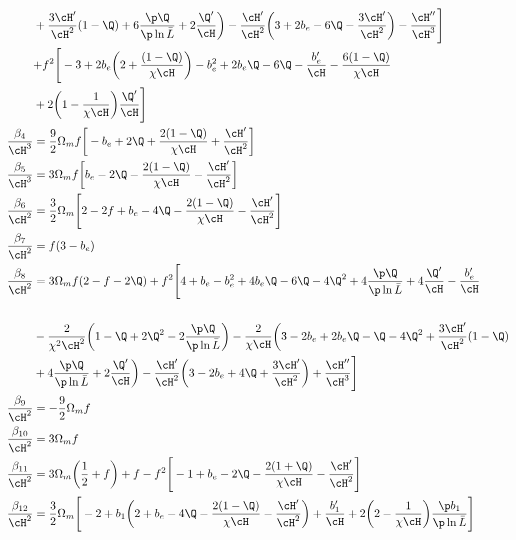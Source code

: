 \begin{align}
& +\frac{3\cH'}{\cH^{2}}(1-\Q) +6\frac{\p \Q}{\p \ln{\bar{L}}} + 2\frac{\Q'}{\cH}\bigg) -\frac{\cH'}{\cH^{2}}\bigg({3}+2b_{e}-6\Q-\frac{3\cH'}{\cH^{2}}\bigg) - \frac{\cH''}{\cH^{3}}\Bigg] \nonumber \\
&  {+} f^{2}\Bigg[-3+2b_{e}\bigg(2+\frac{(1-\Q)}{\chi\cH}\bigg)-b_{e}^{2}+2b_{e}\Q -6\Q-\frac{b_{e}'}{\cH}-\frac{6(1-\Q)}{\chi\cH}\nonumber \\
& +2\bigg(1-\frac{1}{\chi\cH}\bigg)\frac{\Q'}{\cH}\Bigg]  \\ 
\frac{\beta_{4}}{\cH^{3}} &= \frac{9}{2}\Omega_{m}f\bigg[-b_{e}+2\Q+\frac{2(1-\Q)}{\chi \cH}+\frac{\cH'}{\cH^{2}}\bigg]\\ 
{{\frac{\beta_5}{\cH^{3}}}} &= 3\Omega_{m}f\bigg[b_{e}-2\Q-\frac{2(1-\Q)}{\chi\cH}-\frac{\cH'}{\cH^{2}}\bigg] \\ 
\frac{\beta_6}{\cH^{2}} &= \frac{3}{2}\Omega_{m}\Bigg[2-2f+b_{e}-4\Q-\frac{2(1-\Q)}{\chi\cH}-\frac{\cH'}{\cH^{2}}\Bigg] \\
\frac{\beta_7}{\cH^{2}} &= f(3-b_{e}) \\ 
\frac{\beta_8}{\cH^{2}} &= {3\Omega_{m}f(2-f-2\Q)} + f^{2}\Bigg[4+b_{e}-b_{e}^{2}+4b_{e}\Q-{6}\Q-4\Q^{2}+4\frac{\p \Q}{\p \ln{\bar{L}}} + 4\frac{\Q'}{\cH} - \frac{b_{e}'}{\cH}  \nonumber \\\nonumber\\
& - \frac{2}{\chi^{2}\cH^{2}}\bigg(1-\Q+2\Q^{2}-2\frac{\p \Q}{\p \ln{\bar{L}}}\bigg) - \frac{2}{\chi\cH}\bigg(3-2b_{e}+2b_{e}\Q-\Q-4\Q^{2}+\frac{3\cH'}{\cH^{2}}(1-\Q) \nonumber\\
& + 4\frac{\p \Q}{\p \ln{\bar{L}}} + 2\frac{\Q'}{\cH}\bigg) - \frac{\cH'}{\cH^{2}}\bigg(3-2b_{e}+{4}\Q+\frac{3\cH'}{\cH^{2}}\bigg) + \frac{\cH''}{\cH^{3}}\Bigg] \\ 
\frac{\beta_{9}}{\cH^{2}} &= -\frac{9}{2}\Omega_{m}f \\ 
{\frac{\beta_{10}}{\cH^{2}}} &= 3\Omega_{m}f \\ 
\frac{\beta_{11}}{\cH^{2}} &= 3\Omega_{m}\bigg(\frac{1}{2}+f\bigg) + f - f^{2}\Bigg[-1+b_{e}-2\Q- \frac{2(1+\Q)}{\chi\cH}-\frac{\cH'}{\cH^{2}}\Bigg] \\ 
\frac{\beta_{12}}{\cH^{2}} &= \frac{3}{2}\Omega_{m}\Bigg[-2+b_{1}\bigg(2+b_{e}-4\Q-\frac{2(1-\Q)}{\chi\cH} -\frac{\cH'}{\cH^{2}}\bigg) + \frac{b_{1}'}{\cH} + 2\bigg(2-\frac{1}{\chi\cH}\bigg)\frac{\p b_{1}}{\p \ln{\bar{L}}}\Bigg] \nonumber \\

\end{align}
